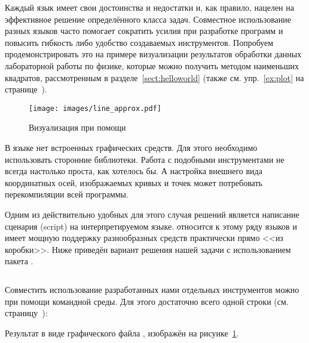 \label{subsect:pyplot}
Каждый язык имеет свои достоинства и недостатки и, как правило, нацелен на эффективное решение определённого класса задач. Совместное использование разных языков часто помогает сократить усилия при разработке программ и повысить гибкость либо удобство создаваемых инструментов. Попробуем продемонстрировать это на примере визуализации результатов обработки данных лабораторной работы по физике, которые можно получить методом наименьших квадратов, рассмотренным в разделе~\ref{sect:helloworld} (также см. упр.~\ref{ex:plot} на странице~\pageref{ex:plot}).

\begin{figure}[h]
  {\centering
    \texttt{[image: images/line\_approx.pdf]}

  }
  \caption{Визуализация при помощи }
  \label{fig:pyplot}
\end{figure}

В языке  нет встроенных графических средств. Для этого необходимо использовать сторонние библиотеки. Работа с подобными инструментами не всегда настолько проста, как хотелось бы. А настройка внешнего вида координатных осей, изображаемых кривых и точек может потребовать перекомпиляции всей программы.

Одним из действительно удобных для этого случая решений является написание сценария (\textenglish{script}) на интерпретируемом языке. \href{\pythonurl}{} относится к этому ряду языков и имеет мощную поддержку разнообразных средств практически прямо <<из коробки>>. Ниже приведён вариант решения нашей задачи с использованием пакета \href{\matplotliburl}{}.

\begin{center}
\end{center}

\inputminted[linenos, fontsize=\small]{py}{cpp/01/src/plot.py}

Совместить использование разработанных нами отдельных инструментов можно при помощи командной среды. Для этого достаточно всего одной строки (см. страницу~\pageref{subsect:shell}):

\noindent Результат в виде графического файла , изображён на рисунке~\ref{fig:pyplot}.
